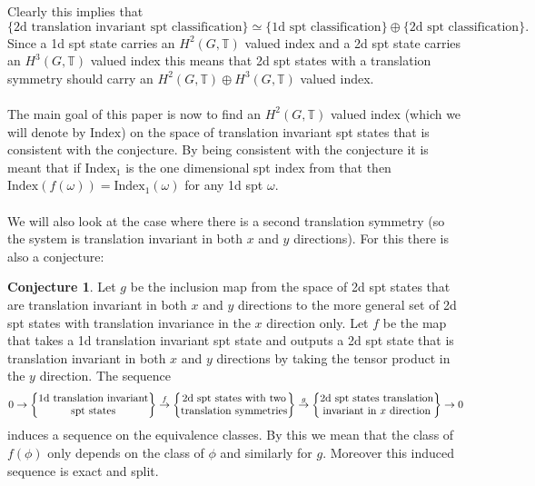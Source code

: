 \documentclass[12pt,a4paper,twoside]{article}
\let\originalleft\left
\let\originalright\right
\renewcommand{\left}{\mathopen{}\mathclose\bgroup\originalleft}
\renewcommand{\right}{\aftergroup\egroup\originalright}
\newcommand{\TT}{\mathbb T}
\theoremstyle{definition}
\newtheorem{conjecture}[theorem]{Conjecture}
\numberwithin{equation}{section}
\begin{document}
Clearly this implies that
\begin{equation}
	\{\text{2d translation invariant spt classification}\}\simeq \{\text{1d spt classification}\}\oplus \{\text{2d spt classification}\}.
\end{equation}
Since a 1d spt state carries an $H^2(G,\TT)$ valued index and a 2d spt state carries an $H^3(G,\TT)$ valued index this means that 2d spt states with a translation symmetry should carry an $H^2(G,\TT)\oplus H^3(G,\TT)$ valued index.\\\\
The main goal of this paper is now to find an $H^2(G,\TT)$ valued index (which we will denote by $\textrm{Index}$) on the space of translation invariant spt states that is consistent with the conjecture. By being consistent with the conjecture it is meant that if $\textrm{Index}_1$ is the one dimensional spt index from \cite{ogata2019classification} that then $\textrm{Index}(f(\omega))=\textrm{Index}_1(\omega)$ for any 1d spt $\omega$.\\\\
We will also look at the case where there is a second translation symmetry (so the system is translation invariant in both $x$ and $y$ directions). For this there is also a conjecture:
\begin{conjecture}\label{conj2}
	Let $g$ be the inclusion map from the space of 2d spt states that are translation invariant in both $x$ and $y$ directions to the more general set of 2d spt states with translation invariance in the $x$ direction only. Let $f$ be the map that takes a 1d translation invariant spt state and outputs a 2d spt state that is translation invariant in both $x$ and $y$ directions by taking the tensor product in the $y$ direction. The sequence
	\begin{equation}
		0\rightarrow\left\{\begin{matrix}\text{1d translation invariant}\\ \text{spt states}\end{matrix}\right\}\stackrel{f}{\rightarrow}\left\{\begin{matrix}\text{2d spt states with two}\\ \text{translation symmetries}\end{matrix}\right\}\stackrel{g}{\rightarrow}\left\{\begin{matrix}\text{2d spt states translation}\\ \text{invariant in $x$ direction}\end{matrix}\right\}\rightarrow 0
	\end{equation}
	induces a sequence on the equivalence classes. By this we mean that the class of $f(\phi)$ only depends on the class of $\phi$ and similarly for $g$. Moreover this induced sequence is exact and split.
\end{conjecture}
\end{document}
